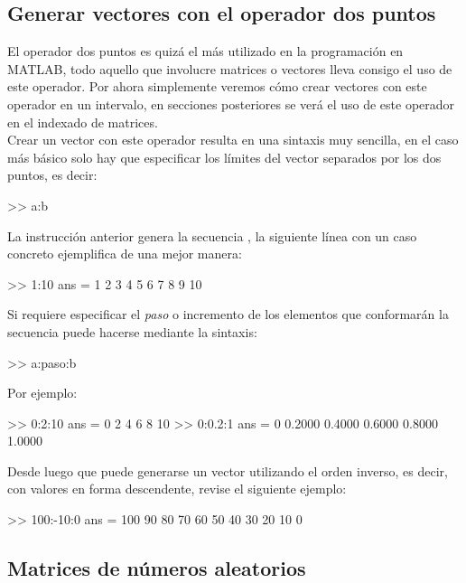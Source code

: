 \subsection{Generar vectores con el operador dos puntos}\label{generar-vectores-con-el-operador-dos-puntos}

El operador dos puntos es quizá el más utilizado en la programación en
MATLAB, todo aquello que involucre matrices o vectores lleva consigo el
uso de este operador. Por ahora simplemente veremos cómo crear vectores
con este operador en un intervalo, en secciones posteriores se verá el
uso de este operador en el indexado de matrices.\\

Crear un vector con este operador resulta en una sintaxis muy sencilla,
en el caso más básico solo hay que especificar los límites del vector
separados por los dos puntos, es decir:

\begin{matlab}
>> a:b 
\end{matlab}

La instrucción anterior genera la secuencia , la siguiente línea con un
caso concreto ejemplifica de una mejor manera:

\begin{matlab}
>> 1:10
ans =
     1     2     3     4     5     6     7     8     9    10
\end{matlab}

Si requiere especificar el \emph{paso} o incremento de los elementos que
conformarán la secuencia puede hacerse mediante la sintaxis:

\begin{matlab}
>> a:paso:b 
\end{matlab}

Por ejemplo:

\begin{matlab}
>> 0:2:10
ans =
     0     2     4     6     8    10
>> 0:0.2:1
ans =
         0    0.2000    0.4000    0.6000    0.8000    1.0000
\end{matlab}

Desde luego que puede generarse un vector utilizando el orden inverso,
es decir, con valores en forma descendente, revise el siguiente ejemplo:

\begin{matlab}
>> 100:-10:0
ans =
   100    90    80    70    60    50    40    30    20    10     0
\end{matlab}

\subsection{Matrices de números aleatorios}\label{matrices-de-numeros-aleatorios}

